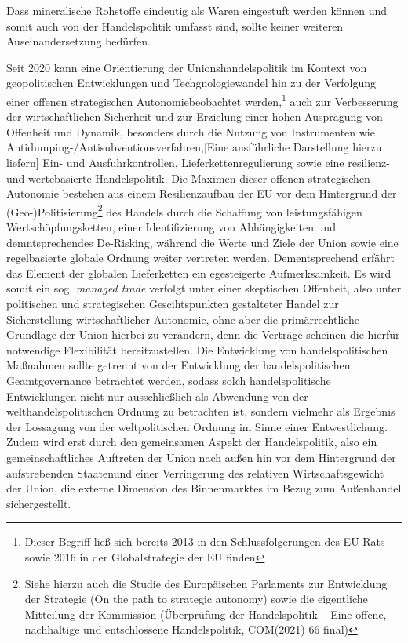 \documentclass[12pt,a4paper,oneside]{book} %
\begin{document}
Dass mineralische Rohstoffe eindeutig als Waren eingestuft werden können und somit auch von der Handelspolitik umfasst sind, sollte keiner weiteren Auseinandersetzung bedürfen.
	

	
	Seit 2020 kann eine Orientierung der Unionshandelspolitik im Kontext von geopolitischen Entwicklungen und Techgnologiewandel hin zu der Verfolgung einer \glqq offenen strategischen Autonomie\grqq beobachtet werden,\footnote{Dieser Begriff ließ sich bereits 2013 in den Schlussfolgerungen des EU-Rats sowie 2016 in der Globalstrategie der EU finden} auch zur Verbesserung der wirtschaftlichen Sicherheit und zur Erzielung einer hohen Ausprägung von Offenheit und Dynamik, besonders durch die Nutzung von Instrumenten wie Antidumping-/Antisubventionsverfahren,[Eine ausführliche Darstellung hierzu liefern]\autocite{Müller-Ibold/Herrmann, EuZW 2022, 1085} Ein- und Ausfuhrkontrollen, Lieferkettenregulierung sowie eine resilienz- und wertebasierte Handelspolitik.\autocite{Paschke, RdTW 2024, 206; Schäffer/Hach, ZRP 2023, 207f; Müller-Ibold, EuZW 2022, 1029, 1034} Die Maximen dieser offenen strategischen Autonomie bestehen aus einem Resilienzaufbau der EU vor dem Hintergrund der (Geo-)Politisierung\footnote{Siehe hierzu auch die Studie des Europäischen Parlaments zur Entwicklung der Strategie (On the path to \glq strategic autonomy\grq) sowie die eigentliche Mitteilung der Kommission (\glqq Überprüfung der Handelspolitik -- Eine offene, nachhaltige und entschlossene Handelspolitik\grqq, COM(2021) 66 final)} des Handels durch die Schaffung von leistungsfähigen Wertschöpfungsketten, einer Identifizierung von Abhängigkeiten und demntsprechendes De-Risking, während die Werte und Ziele der Union sowie eine regelbasierte globale Ordnung weiter vertreten werden.\autocite{Schäffer/hach, ZRP 2023, 207} Dementsprechend erfährt das Element der globalen Lieferketten ein egesteigerte Aufmerksamkeit.\autocite{bibid} Es wird somit ein sog. \textit{managed trade} verfolgt unter einer \glqq skeptischen Offenheit\grqq, also unter politischen und strategischen Gescihtspunkten gestalteter Handel zur Sicherstellung wirtschaftlicher Autonomie, ohne aber die primärrechtliche Grundlage der Union hierbei zu verändern, denn die Verträge scheinen die hierfür notwendige Flexibilität bereitzustellen.\autocite[so zumindest]{Paschke, RdTW 2024, 206, 216; Schäffer, EuZW 2023, 695, 700} Die Entwicklung von handelspolitischen Maßnahmen sollte getrennt von der Entwicklung der handelspolitischen Geamtgovernance betrachtet werden, sodass solch handelspolitische Entwicklungen nicht nur ausschließlich als Abwendung von der welthandelspolitischen Ordnung zu betrachten ist, sondern vielmehr als Ergebnis der Lossagung von der weltpolitischen Ordnung im Sinne einer \glqq Entwestlichung\grqq.\autocite{Altemöller, EuZW 2019, 321ff} Zudem wird erst durch den gemeinsamen Aspekt der Handelspolitik, also ein gemeinschaftliches Auftreten der Union nach außen hin vor dem Hintergrund der \glqq aufstrebenden Staaten\grqq und einer Verringerung des relativen Wirtschaftsgewicht der Union, die externe Dimension des Binnenmarktes im Bezug zum Außenhandel sichergestellt.\autocite{Callies/Ruffert, Art. 206 AEUV, Rn. 3; Art. 207 Rn. 3; EuGH, Gutachten 1/75, Slg. 1975, 1355, S. 1363 f.}
\end{document}
